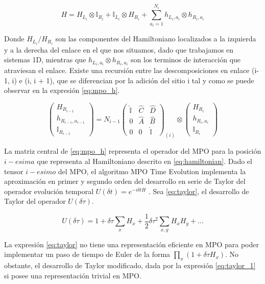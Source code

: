 \begin{equation}
  H = H_{L_i} \otimes \mathbb{I}_{R_i} + \mathbb{I}_{L_i} \otimes H_{R_i} + \sum_{a_i=1}^{N_i} h_{L_i, a_i} \otimes h_{R_i, a_i}
  \label{eq:hamiltonian}
\end{equation}

Donde $H_{L_i}/H_{R_i}$
son las componentes del Hamiltoniano localizados a la izquierda y a la derecha del enlace en el que nos situamos, dado que trabajamos en sistemas 1D, mientras que $h_{L_i, a_i} \otimes h_{R_i, a_i}$ son los terminos de interacción que atraviesan el enlace. Existe una recursión entre las descomposiciones en enlace (i-1, i) e (i, i + 1), que se diferencian por la adición del sitio i tal y como se puede observar en la expresión \ref{eq:mpo_h}.

\begin{equation}
  \begin{pmatrix}
H_{R_{i-1}} \\
h_{R_{i-1}, a_{i-1}} \\
\mathbb{I}_{R_{i-1}}
\end{pmatrix}
=
N_{i-1}
\begin{pmatrix}
\hat{\mathbb{I}} & \hat{C} & \hat{D} \\
0 & \hat{A} & \hat{B} \\
0 & 0 & \hat{\mathbb{I}}
\end{pmatrix}_{(i)}
\otimes
\begin{pmatrix}
H_{R_i} \\
h_{R_i, a_i} \\
\mathbb{I}_{R_i}
\end{pmatrix}
\label{eq:mpo_h}
\end{equation}

La matriz central de \ref{eq:mpo_h} representa el operador del MPO para la posición $i-esima$ que representa al Hamiltoniano descrito en \ref{eq:hamiltonian}. Dado el tensor $i-esimo$ del MPO, el algoritmo MPO Time Evolution implementa la aproximación en primer y segundo orden del desarrollo en serie de Taylor del operador evolución temporal $U(\delta t) = e^{-i\delta t H}$ . Sea \ref{eq:taylor}, el desarrollo de Taylor del operador $U(\delta\tau)$.


\begin{equation}
U(\delta\tau) = 1 + \delta\tau \sum_{x} H_x + \frac{1}{2} \delta\tau^2 \sum_{x,y} H_x H_y + \ldots
\label{eq:taylor}
\end{equation}

La expresión \ref{eq:taylor} no tiene una representación eficiente en MPO para poder implementar un paso de tiempo de Euler de la forma $\prod_{x}(1 + \delta\tau H_{x})$. No obstante, el desarrollo de Taylor modificado, dada por la expresión \ref{eq:taylor_1} si posee una representación trivial en MPO.

